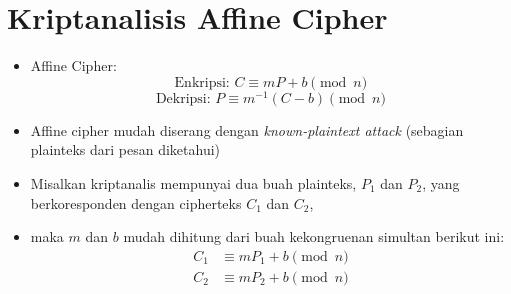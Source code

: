 \documentclass{article}
\begin{document}

\section*{Kriptanalisis Affine Cipher}

\begin{itemize}
    \item Affine Cipher:
    \[ \text{Enkripsi: } C \equiv mP + b \pmod{n} \]
    \[ \text{Dekripsi: } P \equiv m^{-1} (C - b) \pmod{n} \]
    
    \item Affine cipher mudah diserang dengan \textit{known-plaintext attack} (sebagian plainteks dari pesan diketahui)
    
    \item Misalkan kriptanalis mempunyai dua buah plainteks, $P_1$ dan $P_2$, yang berkoresponden dengan cipherteks $C_1$ dan $C_2$,
    
    \item maka $m$ dan $b$ mudah dihitung dari buah kekongruenan simultan berikut ini:
    \begin{align*}
        C_1 &\equiv mP_1 + b \pmod{n} \\
        C_2 &\equiv mP_2 + b \pmod{n}
    \end{align*}
\end{itemize}
\end{document}
